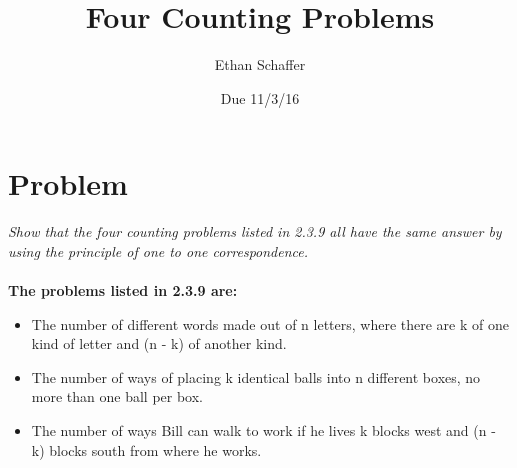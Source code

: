 \documentclass[11pt]{article} %
\title{Four Counting Problems}
\author{Ethan Schaffer}
\date{Due 11/3/16}
\newcommand\tab[1][1cm]{\hspace*{#1}}
\begin{document}
\maketitle
\section* {Problem}
\textit{Show that the four counting problems listed in 2.3.9 all have the same answer by using the principle of one to one correspondence.}
\\
\\
\tab \textbf{The problems listed in 2.3.9 are:}
\begin{itemize}
\item The number of different words made out of n letters, where there are k of one kind of letter and (n - k) of another kind.
\item The number of ways of placing k identical balls into n different boxes, no more than one ball per box.
\item The number of ways Bill can walk to work if he lives k blocks west and (n - k) blocks south from where he works.
\end{itemize}
\end{document}
